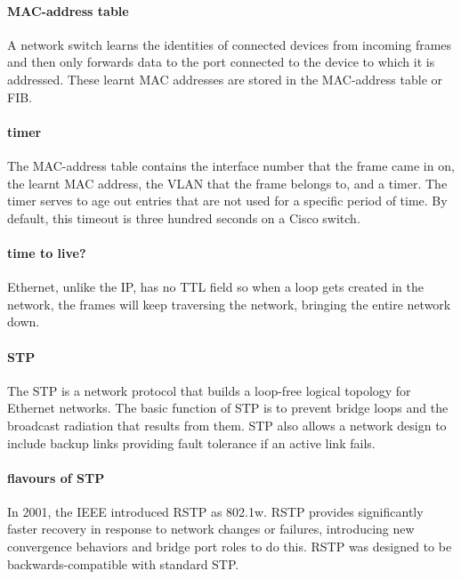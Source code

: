 \paragraph{\acs{MAC}-address table}
A network switch learns the identities of connected devices from incoming frames and then only forwards data to the port connected to the device to which it is addressed.
These learnt \acs{MAC} addresses are stored in the \ac{MAC}-address table or \acf{FIB}.

\paragraph{timer}
The \acs{MAC}-address table contains the interface number that the frame came in on, the learnt \acs{MAC} address, the \acs{VLAN} that the frame belongs to, and a timer.
The timer serves to age out entries that are not used for a specific period of time.
By default, this timeout is three hundred seconds on a Cisco switch.

\paragraph{time to live?}
Ethernet, unlike the \acl{IP}, has no \acl{TTL} field so when a loop gets created in the network, the frames will keep traversing the network, bringing the entire network down.

\paragraph{\acf{STP}}
The \acl{STP} is a network protocol that builds a loop-free logical topology for Ethernet networks.
The basic function of \acs{STP} is to prevent bridge loops and the broadcast radiation that results from them.
\acs{STP} also allows a network design to include backup links providing fault tolerance if an active link fails.

\paragraph{flavours of \acs{STP}}
In 2001, the \acs{IEEE} introduced \acf{RSTP} as 802.1w.
\acs{RSTP} provides significantly faster recovery in response to network changes or failures, introducing new convergence behaviors and bridge port roles to do this.
\acs{RSTP} was designed to be backwards-compatible with standard \acs{STP}.


